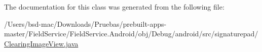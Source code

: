 The documentation for this class was generated from the following file\+:\begin{DoxyCompactItemize}
\item 
/\+Users/bsd-\/mac/\+Downloads/\+Pruebas/prebuilt-\/apps-\/master/\+Field\+Service/\+Field\+Service.\+Android/obj/\+Debug/android/src/signaturepad/\hyperlink{_clearing_image_view_8java}{Clearing\+Image\+View.\+java}\end{DoxyCompactItemize}
